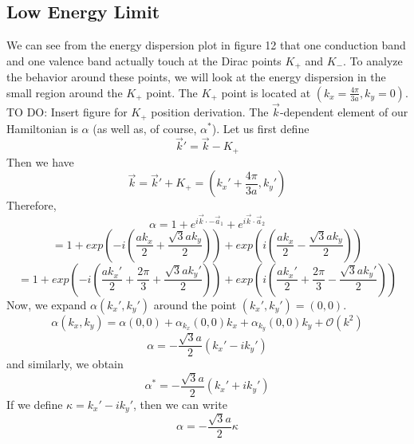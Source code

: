 \documentclass{article}
\begin{document}
\subsection{Low Energy Limit}
We can see from the energy dispersion plot in figure 12 that one conduction band and one valence band actually touch at the Dirac points $K_{+}$ and $K_{-}$.
To analyze the behavior around these points, we will look at the energy dispersion in the small region around the $K_{+}$ point. The $K_{+}$ point is located at
$(k_{x} = \frac{4\pi}{3a}, k_{y} = 0)$. TO DO: Insert figure for $K_{+}$ position derivation.
The $\vec{k}$-dependent element of our Hamiltonian is $\alpha$ (as well as, of course, $\alpha^{*}$). Let us first define
\begin{equation}
\vec{k}' = \vec{k} - K_{+}
\end{equation}
Then we have
\begin{equation}
\vec{k} = \vec{k}' + K_{+} = (k_{x}' + \frac{4\pi}{3a}, k_{y}')
\end{equation}
Therefore,
$$
\alpha = 1 + e^{i\vec{k}\cdot-\vec{a}_{1}} + e^{i\vec{k}\cdot\vec{a}_{2}}
$$
\begin{equation}
 = 1 + exp\left (-i\left (\frac{ak_{x}}{2} + \frac{\sqrt{3}ak_{y}}{2}\right )\right ) + exp\left (i\left (\frac{ak_{x}}{2} - \frac{\sqrt{3}ak_{y}}{2}\right )\right )
\end{equation}
\begin{equation}
 = 1 + exp\left (-i\left (\frac{ak_{x}'}{2} + \frac{2\pi}{3} + \frac{\sqrt{3}ak_{y}'}{2}\right )\right ) + exp\left (i\left (\frac{ak_{x}'}{2} + \frac{2\pi}{3} - \frac{\sqrt{3}ak_{y}'}{2}\right )\right )
\end{equation}
Now, we expand $\alpha(k_{x}', k_{y}')$ around the point $(k_{x}', k_{y}') = (0,0)$.
\begin{equation}
\alpha(k_{x}, k_{y}) = \alpha(0,0) + \alpha_{k_{x}}(0,0)k_{x} + \alpha_{k_{y}}(0,0)k_{y} + \mathcal{O}(k^{2})
\end{equation}
\begin{equation}
\alpha = -\frac{\sqrt{3}a}{2}(k_{x}' - ik_{y}')
\end{equation}
and similarly, we obtain
\begin{equation}
\alpha^{*} = -\frac{\sqrt{3}a}{2}(k_{x}' + ik_{y}')
\end{equation}
If we define $\kappa = k_{x}' - ik_{y}'$, then we can write
\begin{equation}
\alpha = -\frac{\sqrt{3}a}{2}\kappa
\end{equation}
\end{document}
